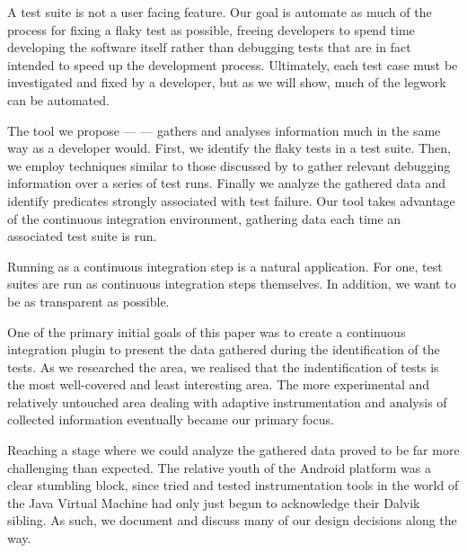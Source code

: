 A test suite is not a user facing feature. Our goal is automate as much of the process for fixing a flaky test as possible, freeing developers to spend time developing the software itself rather than debugging tests that are in fact intended to speed up the development process. Ultimately, each test case must be investigated and fixed by a developer, but as we will show, much of the legwork can be automated.

The tool we propose --- \emph{\splatter} --- gathers and analyses information much in the same way as a developer would. First, we identify the flaky tests in a test suite. Then, we employ techniques similar to those discussed by \citet{ArumugaNainar:2010:ABI:1806799.1806839} to gather relevant debugging information over a series of test runs. Finally we analyze the gathered data and identify predicates strongly associated with test failure. Our tool takes advantage of the continuous integration environment, gathering data each time an associated test suite is run.

Running as a continuous integration step is a natural application. For one, test suites are run as continuous integration steps themselves. In addition, we want to be as transparent as possible.

One of the primary initial goals of this paper was to create a continuous integration plugin to present the data gathered during the identification of the \flaky{} tests. As we researched the area, we realised that the indentification of \flaky{} tests is the most well-covered and least interesting area. The more experimental and relatively untouched area dealing with adaptive instrumentation and analysis of collected information eventually became our primary focus.

Reaching a stage where we could analyze the gathered data proved to be far more challenging than expected. The relative youth of the Android platform was a clear stumbling block, since tried and tested instrumentation tools in the world of the Java Virtual Machine had only just begun to acknowledge their Dalvik sibling. As such, we document and discuss many of our design decisions along the way.

